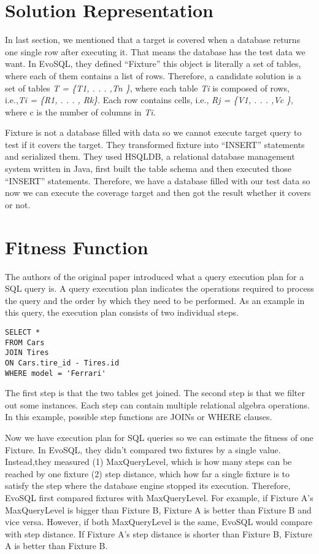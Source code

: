 \section{Solution Representation}
In last section, we mentioned that a target is covered when a database returns one single row after executing it. That means the database has the test data we want. In EvoSQL, they defined “Fixture” this object is literally a set of tables, where each of them contains a list of rows. Therefore, a candidate solution is a set of tables \textit{T = \{T1, . . . ,Tn \}}, where each table \textit{Ti} is composed of rows, i.e.,\textit{Ti = \{R1, . . . , Rk\}}. Each row contains cells, i.e., \textit{Rj = \{V1, . . . ,Vc \}}, where c is the number of columns in \textit{Ti}. 

Fixture is not a database filled with data so we cannot execute target query to test if it covers the target. They transformed fixture into “INSERT” statements and serialized them. They used HSQLDB, a relational database management system written in Java, first built the table schema and then executed those “INSERT” statements. Therefore, we have a database filled with our test data so now we can execute the coverage target and then got the result whether it covers or not.

\section{Fitness Function}
The authors of the original paper introduced what a query execution plan for a SQL query is. A query execution plan indicates the operations required to process the query and the order by which they need to be performed. As an example in this query, the execution plan consists of two individual steps.
\begin{verbatim}
SELECT * 
FROM Cars
JOIN Tires
ON Cars.tire_id - Tires.id
WHERE model = 'Ferrari'
\end{verbatim}

The first step is that the two tables get joined. The second step is that we filter out some instances. Each step can contain multiple relational algebra operations. In this example, possible step functions are JOINs or WHERE clauses.

Now we have execution plan for SQL queries so we can estimate the fitness of one Fixture. In EvoSQL, they didn't compared two fixtures by a single value. Instead,they measured (1) MaxQueryLevel, which is how many steps can be reached by one fixture (2) step distance, which how far a single fixture is to satisfy the step where the database engine stopped its execution. Therefore, EvoSQL first compared fixtures with MaxQueryLevel. For example, if Fixture A's MaxQueryLevel is bigger than Fixture B, Fixture A is better than Fixture B and vice versa. However, if both MaxQueryLevel is the same, EvoSQL would compare with step distance. If Fixture A's step distance is shorter than Fixture B, Fixture A is better than Fixture B. 
